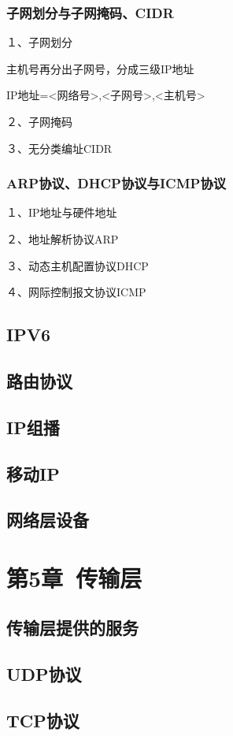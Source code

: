 \documentclass{ctexart}
\begin{document}
\subsubsection{子网划分与子网掩码、CIDR}
１、子网划分

主机号再分出子网号，分成三级IP地址

IP地址={<网络号>,<子网号>,<主机号>}



２、子网掩码

３、无分类编址CIDR
\subsubsection{ARP协议、DHCP协议与ICMP协议}
１、IP地址与硬件地址

２、地址解析协议ARP

３、动态主机配置协议DHCP

４、网际控制报文协议ICMP

\subsection{IPV6}

\subsection{路由协议}
\subsection{IP组播}
\subsection{移动IP}
\subsection{网络层设备}

\section{第5章\ 传输层}
\subsection{传输层提供的服务}
\subsection{UDP协议}
\subsection{TCP协议}
\end{document}
